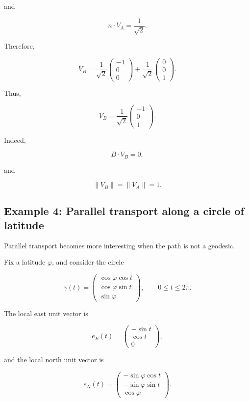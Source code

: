 \documentclass[12pt,a4paper]{article}
\theoremstyle{notespace}
\begin{document}
and

\[
n\cdot V_A
=
\frac{1}{\sqrt{2}}.
\]

Therefore,

\[
V_B
=
\frac{1}{\sqrt{2}}
\begin{pmatrix}
	-1\\
	0\\
	0
\end{pmatrix}
+
\frac{1}{\sqrt{2}}
\begin{pmatrix}
	0\\
	0\\
	1
\end{pmatrix}.
\]

Thus,

\[
\boxed{
	V_B
	=
	\frac{1}{\sqrt{2}}
	\begin{pmatrix}
		-1\\
		0\\
		1
	\end{pmatrix}.
}
\]

Indeed,

\[
B\cdot V_B=0,
\]

and

\[
\|V_B\|=\|V_A\|=1.
\]

\subsection{Example 4: Parallel transport along a circle of latitude}

Parallel transport becomes more interesting when the path is not a
geodesic.

Fix a latitude \(\varphi\), and consider the circle

\[
\gamma(t)
=
\begin{pmatrix}
	\cos\varphi\cos t\\
	\cos\varphi\sin t\\
	\sin\varphi
\end{pmatrix},
\qquad
0\leq t\leq 2\pi.
\]

The local east unit vector is

\[
e_E(t)
=
\begin{pmatrix}
	-\sin t\\
	\cos t\\
	0
\end{pmatrix},
\]

and the local north unit vector is

\[
e_N(t)
=
\begin{pmatrix}
	-\sin\varphi\cos t\\
	-\sin\varphi\sin t\\
	\cos\varphi
\end{pmatrix}.
\]
\end{document}
